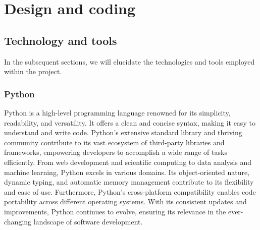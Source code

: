 \chapter{Design and coding}\label{cap:design-coding}

\section{Technology and tools}\label{sec:technology-tools}
In the subsequent sections, we will elucidate the technologies and tools employed within the project.
\subsection{Python}\label{subsec:python}
Python is a high-level programming language renowned for its simplicity, readability, and versatility. 
It offers a clean and concise syntax, making it easy to understand and write code. 
Python's extensive standard library and thriving community contribute to its vast ecosystem of third-party libraries and frameworks, empowering developers to accomplish a wide range of tasks efficiently. 
From web development and scientific computing to data analysis and machine learning, Python excels in various domains. 
Its object-oriented nature, dynamic typing, and automatic memory management contribute to its flexibility and ease of use. Furthermore, Python's cross-platform compatibility enables code portability across different operating systems. 
With its consistent updates and improvements, Python continues to evolve, ensuring its relevance in the ever-changing landscape of software development.


